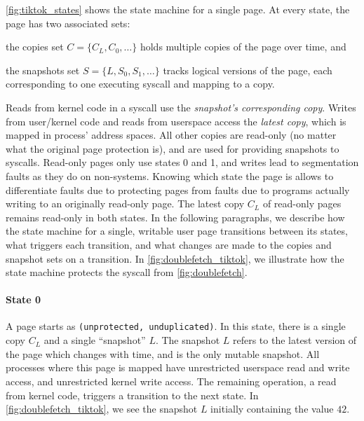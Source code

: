 \documentclass[letterpaper,twocolumn,10pt, anonymous]{article}
\begin{document}
\autoref{fig:tiktok_states} shows the state machine for a single page.
At every state, the page has two associated sets:
\begin{inparaenum}
  \item the copies set $C = \{C_L, C_0, \dots\}$ holds multiple copies of the page over time, and
  \item the snapshots set $S = \{L, S_0, S_1, \dots\}$ tracks logical versions of the page, each corresponding to one executing syscall and mapping to a copy. 
\end{inparaenum}
Reads from kernel code in a syscall use the \emph{snapshot's corresponding copy}.
Writes from user/kernel code and reads from userspace access the \emph{latest 
copy}, which is mapped in process' address spaces.
All other copies are read-only (no matter what the original page protection is), and are used for providing snapshots to syscalls.
Read-only pages only use states 0 and 1, and writes lead to segmentation faults
as they do on non-\tiktok systems.
Knowing which state the page is allows \tiktok to differentiate faults due
to protecting pages from faults due to programs actually writing to an 
originally read-only page.
The latest copy $C_L$ of read-only pages remains read-only in both states.
In the following paragraphs, we describe how the state machine for a single, 
writable user page transitions between its states, what triggers each transition, 
and what changes are made to the copies and snapshot sets on a transition.
In \autoref{fig:doublefetch_tiktok}, we illustrate how the state machine protects the 
syscall from \autoref{fig:doublefetch}.

\paragraph{State 0}
A page starts as \texttt{(unprotected, unduplicated)}.
In this state, there is a single copy $C_L$ and a single ``snapshot'' $L$. 
The snapshot $L$ refers to the latest version of the page which changes 
with time, and is the only mutable snapshot.
All processes where this page is mapped have unrestricted userspace read and write 
access, and unrestricted kernel write access.
The remaining operation, a read from kernel code, triggers a transition to 
the next state.
In \autoref{fig:doublefetch_tiktok}, we see the snapshot $L$ initially containing 
the value $42$.
\end{document}
